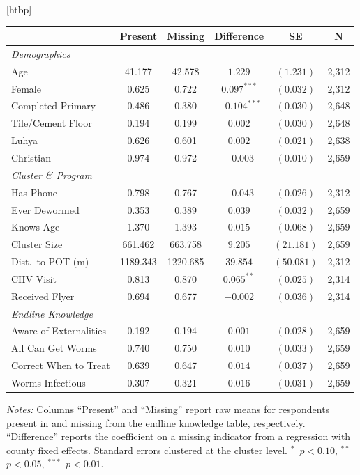 [htbp]
\centering

\label{tab:attrition-covariate-balance}
\begin{tabular}{l ccccc}
\hline\hline
 & \multicolumn{1}{c}{Present} & \multicolumn{1}{c}{Missing} & \multicolumn{1}{c}{Difference} & \multicolumn{1}{c}{SE} & \multicolumn{1}{c}{N} \\
\hline
\addlinespace
\textit{Demographics} \\
\addlinespace
Age & 41.177 & 42.578 & $1.229$ & $(1.231)$ & 2,312 \\
Female & 0.625 & 0.722 & $0.097^{***}$ & $(0.032)$ & 2,312 \\
Completed Primary & 0.486 & 0.380 & $-0.104^{***}$ & $(0.030)$ & 2,648 \\
Tile/Cement Floor & 0.194 & 0.199 & $0.002$ & $(0.030)$ & 2,648 \\
Luhya & 0.626 & 0.601 & $0.002$ & $(0.021)$ & 2,638 \\
Christian & 0.974 & 0.972 & $-0.003$ & $(0.010)$ & 2,659 \\
\addlinespace
\textit{Cluster \& Program} \\
\addlinespace
Has Phone & 0.798 & 0.767 & $-0.043$ & $(0.026)$ & 2,312 \\
Ever Dewormed & 0.353 & 0.389 & $0.039$ & $(0.032)$ & 2,659 \\
Knows Age & 1.370 & 1.393 & $0.015$ & $(0.068)$ & 2,659 \\
Cluster Size & 661.462 & 663.758 & $9.205$ & $(21.181)$ & 2,659 \\
Dist.\ to POT (m) & 1189.343 & 1220.685 & $39.854$ & $(50.081)$ & 2,312 \\
CHV Visit & 0.813 & 0.870 & $0.065^{**}$ & $(0.025)$ & 2,314 \\
Received Flyer & 0.694 & 0.677 & $-0.002$ & $(0.036)$ & 2,314 \\
\addlinespace
\textit{Endline Knowledge} \\
\addlinespace
Aware of Externalities & 0.192 & 0.194 & $0.001$ & $(0.028)$ & 2,659 \\
All Can Get Worms & 0.740 & 0.750 & $0.010$ & $(0.033)$ & 2,659 \\
Correct When to Treat & 0.639 & 0.647 & $0.014$ & $(0.037)$ & 2,659 \\
Worms Infectious & 0.307 & 0.321 & $0.016$ & $(0.031)$ & 2,659 \\
\hline\hline
\end{tabular}
\par\smallskip\footnotesize\textit{Notes:} Columns ``Present'' and ``Missing'' report raw means for respondents present in and missing from the endline knowledge table, respectively. ``Difference'' reports the coefficient on a missing indicator from a regression with county fixed effects. Standard errors clustered at the cluster level. $^{*}$~$p<0.10$, $^{**}$~$p<0.05$, $^{***}$~$p<0.01$.

